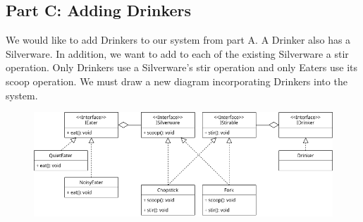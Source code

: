 \documentclass{article}
\begin{document}
\subsection*{Part C: Adding Drinkers}

We would like to add Drinkers to our system from part A. A Drinker also has a Silverware. In addition, we want to add to each of the existing Silverware a stir operation. Only Drinkers use a Silverware's stir operation and only Eaters use its scoop operation. We must draw a new diagram incorporating Drinkers into the system.

\begin{figure}[ht]
	\includegraphics[width=\textwidth]{hw4q1c.png}
\end{figure}
\end{document}
